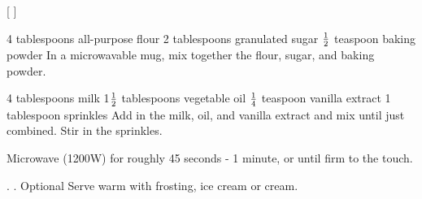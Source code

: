 
[
]

\begin{step}
4 tablespoons all-purpose flour
2 tablespoons granulated sugar
$\frac{1}{2}$ teaspoon baking powder
\method
In a microwavable mug, mix together the flour, sugar, and baking powder.
\end{step}

\begin{step}
4 tablespoons milk
1$\frac{1}{2}$ tablespoons vegetable oil
$\frac{1}{4}$ teaspoon vanilla extract
1 tablespoon sprinkles
\method
Add in the milk, oil, and vanilla extract and mix until just combined. Stir in the sprinkles.

Microwave (1200W) for roughly 45 seconds - 1 minute, or until firm to the touch.
\end{step}

\begin{step}
. . Optional
\method
Serve warm with frosting, ice cream or cream.


\end{step}